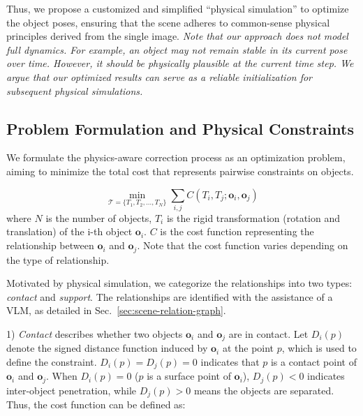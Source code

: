 Thus, we propose a customized and simplified ``physical simulation'' to optimize the object poses, ensuring that the scene adheres to common-sense physical principles derived from the single image.
\emph{Note that our approach does not model full dynamics. For example, an object may not remain stable in its current pose over time. However, it should be physically plausible at the current time step. We argue that our optimized results can serve as a reliable initialization for subsequent physical simulations.}




\subsection{Problem Formulation and Physical Constraints}
\label{sec:physical-constraints}

We formulate the physics-aware correction process as an optimization problem, aiming to minimize the total cost that represents pairwise constraints on objects.

\begin{equation}
\label{eq:physics-aware-objective}
    \min_{\mathcal{T}=\{T_1,T_2,\dots,T_N\}} \sum_{i,j}C(T_i,T_j;\bm{o}_i,\bm{o}_j)
\end{equation}
where $N$ is the number of objects, $T_i$ is the rigid transformation (rotation and translation) of the i-th object $\bm{o}_i$. $C$ is the cost function representing the  relationship between $\bm{o}_i$ and $\bm{o}_j$. Note that the cost function varies depending on the type of relationship.

Motivated by physical simulation, we categorize the relationships into two types: \emph{contact} and \emph{support}. The relationships are identified with the assistance of a VLM, as detailed in Sec.~\ref{sec:scene-relation-graph}.

1) \emph{Contact} describes whether two objects $\bm{o}_i$ and $\bm{o}_j$ are in contact. Let $D_i(p)$ denote the signed distance function induced by $\bm{o}_i$ at the point $p$, which is used to define the constraint. $D_i(p)=D_j(p)=0$ indicates that $p$ is a contact point of $\bm{o}_i$ and $\bm{o}_j$. When $D_i(p)=0$ ($p$ is a surface point of $\bm{o}_i$), $D_j(p)<0$ indicates inter-object penetration, while $D_j(p)>0$ means the objects are separated. Thus, the cost function can be defined as:

